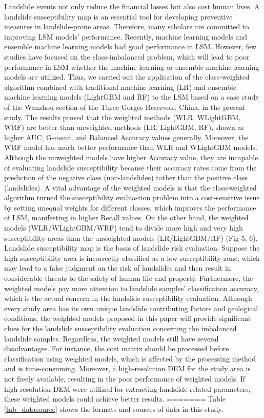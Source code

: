 \documentclass[a4paper,fleqn]{cas-sc}
\begin{document}
Landslide events not only reduce the financial losses but also cost human lives. A landslide susceptibility map is an essential tool for developing preventive measures in landslide-prone areas. Therefore, many scholars are committed to improving LSM models' performance. Recently, machine learning models and ensemble machine learning models had good performance in LSM. However, few studies have focused on the class-imbalanced problem, which will lead to poor performance in LSM whether the machine learning or ensemble machine learning models are utilized. Thus, we carried out the application of the class-weighted algorithm combined with traditional machine learning (LR) and ensemble machine learning models (LightGBM and RF) to the LSM based on a case study of the Wanzhou section of the Three Gorges Reservoir, China, in the present study. 
The results proved that the weighted methods (WLR, WLightGBM, WRF) are better than unweighted methods (LR, LightGBM, RF), shown as higher AUC, G-mean, and Balanced Accuracy values generally. Moreover, the WRF model has much better performance than WLR and WLightGBM models. Although the unweighted models have higher Accuracy value, they are incapable of evaluating landslide susceptibility because their accuracy rates come from the prediction of the negative class (non-landslides) rather than the positive class (landslides). A vital advantage of the weighted models is that the class-weighted algorithm turned the susceptibility evalua-tion problem into a cost-sensitive issue by setting unequal weights for different classes, which improves the performance of LSM, manifesting in higher Recall values. On the other hand, the weighted models (WLR/WLightGBM/WRF) tend to divide more high and very high susceptibility areas than the unweighted models (LR/LightGBM/RF) (Fig 5, 6). Landslide susceptibility map is the basis of landslide risk evaluation. Suppose the high susceptibility area is incorrectly classified as a low susceptibility zone, which may lead to a false judgment on the risk of landslides and then result in considerable threats to the safety of human life and property. Furthermore, the weighted models pay more attention to landslide samples' classification accuracy, which is the actual concern in the landslide susceptibility evaluation. Although every study area has its own unique landslide contributing factors and geological conditions, the weighted models proposed in this paper will provide significant clues for the landslide susceptibility evaluation concerning the imbalanced landslide samples. Regardless, the weighted models still have several disadvantages. For instance, the cost matrix should be processed before classiﬁcation using weighted models, which is affected by the processing method and is time-consuming. Moreover, a high-resolution DEM for the study area is not freely available, resulting in the poor performance of weighted models. If high-resolution DEM were utilized for extracting landslide-related parameters, these weighted models could achieve better results. 
=======
Table \ref{tab_datasource} shows the formats and sources of data in this study. 
\end{document}
